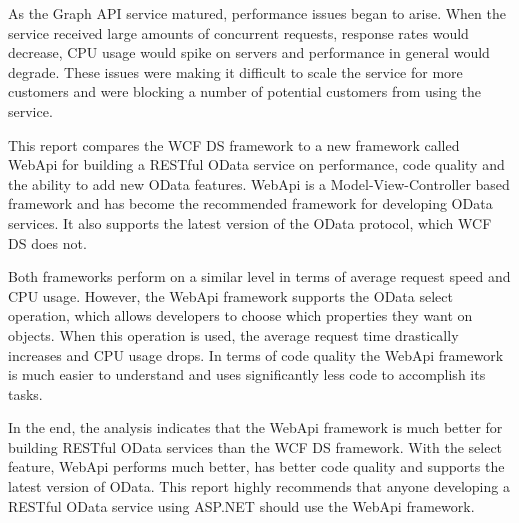\documentclass[se]{uw-wkrpt}
\begin{document}
As the Graph API service matured, performance issues began to arise. When the service received large amounts of concurrent requests, response rates would decrease, CPU usage would spike on servers and performance in general would degrade. These issues were making it difficult to scale the service for more customers and were blocking a number of potential customers from using the service.

This report compares the WCF DS framework to a new framework called WebApi for building a RESTful OData service on performance, code quality and the ability to add new OData features. WebApi is a Model-View-Controller based framework and has become the recommended framework for developing OData services. It also supports the latest version of the OData protocol, which WCF DS does not.

Both frameworks perform on a similar level in terms of average request speed and CPU usage. However, the WebApi framework supports the OData select operation, which allows developers to choose which properties they want on objects. When this operation is used, the average request time drastically increases and CPU usage drops. In terms of code quality the WebApi framework is much easier to understand and uses significantly less code to accomplish its tasks.

In the end, the analysis indicates that the WebApi framework is much better for building RESTful OData services than the WCF DS framework. With the select feature, WebApi performs much better, has better code quality and supports the latest version of OData. This report highly recommends that anyone developing a RESTful OData service using ASP.NET should use the WebApi framework.

\tableofcontents
\listoffigures
\listoftables

\mainmatter
\end{document}

